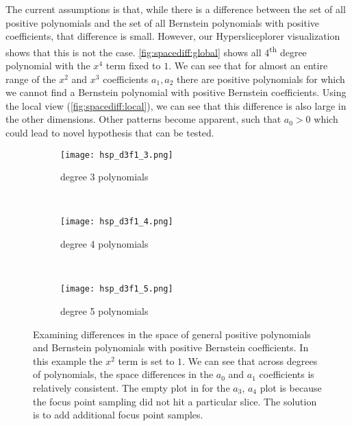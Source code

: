 The current assumptions is that, while there is a difference between the set of all positive polynomials and the set of all Bernstein polynomials with positive coefficients,
that difference is small. However, our Hypersliceplorer visualization shows
that this is not the case. \autoref{fig:spacediff:global} 
shows all 4\textsuperscript{th} degree polynomial with the $x^4$ term fixed to
$1$. We can see that for almost an entire range of the $x^2$ and $x^3$
coefficients $a_1, a_2$ there are positive polynomials for which we cannot find a
Bernstein polynomial with positive Bernstein coefficients. Using the local view
(\autoref{fig:spacediff:local}), we can see that this difference is also
large in the other dimensions. Other patterns become apparent, such that $a_0>0$ which could lead to novel hypothesis that can be tested.

\begin{figure*}
  \centering
  \begin{subfigure}[b]{0.3\textwidth}
    \texttt{[image: hsp\_d3f1\_3.png]}
    \caption{degree 3 polynomials}
    \label{fig:dimcmp:3}
  \end{subfigure}
  ~
  \begin{subfigure}[b]{0.3\textwidth}
    \texttt{[image: hsp\_d3f1\_4.png]}
    \caption{degree 4 polynomials}
    \label{fig:dimcmp:4}
  \end{subfigure}
  ~
  \begin{subfigure}[b]{0.3\textwidth}
    \texttt{[image: hsp\_d3f1\_5.png]}
    \caption{degree 5 polynomials}
    \label{fig:dimcmp:5}
  \end{subfigure}
  \caption{%
    Examining differences in the space of general positive polynomials and Bernstein 
    polynomials with positive Bernstein coefficients. In this example the 
    $x^2$ term is set to $1$. We can see that across degrees of polynomials,
    the space differences in the $a_0$ and $a_1$ coefficients is relatively
    consistent. The empty plot in  for the $a_3$, $a_4$
    plot is because the focus point sampling did not hit a particular slice.
    The solution is to add additional focus point samples. 
  }
  \label{fig:dimcmp}
\end{figure*}

